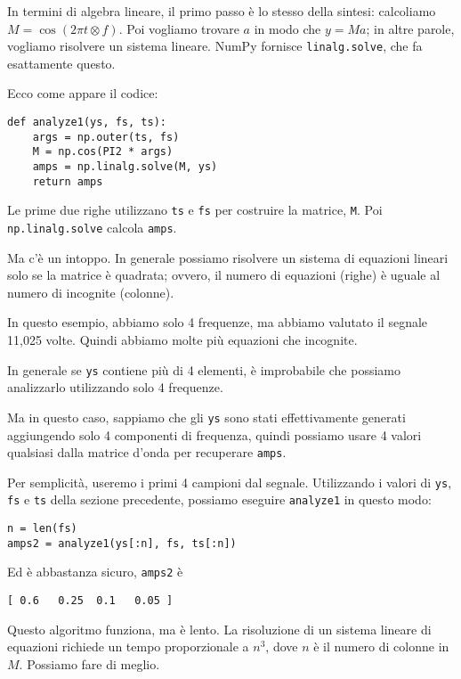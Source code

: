 \documentclass[12pt,a4paper]{book}
\begin{document}
In termini di algebra lineare, il primo passo è lo stesso della sintesi: calcoliamo $M = \cos (2 \pi t \otimes f)$. Poi vogliamo trovare $a$ in modo che $y = M a$; in altre parole, vogliamo risolvere un sistema lineare. NumPy fornisce {\tt linalg.solve}, che fa esattamente questo.

Ecco come appare il codice:

\begin{verbatim} 
def analyze1(ys, fs, ts):
    args = np.outer(ts, fs)
    M = np.cos(PI2 * args)
    amps = np.linalg.solve(M, ys)
    return amps
 \end{verbatim} 

Le prime due righe utilizzano {\tt ts} e {\tt fs} per costruire la matrice, {\tt M}. Poi {\tt np.linalg.solve} calcola {\tt amps}.

Ma c'è un intoppo. In generale possiamo risolvere un sistema di equazioni lineari solo se la matrice è quadrata; ovvero, il numero di equazioni (righe) è uguale al numero di incognite (colonne).

In questo esempio, abbiamo solo 4 frequenze, ma abbiamo valutato il segnale 11,025 volte. Quindi abbiamo molte più equazioni che incognite.

In generale se {\tt ys} contiene più di 4 elementi, è improbabile che possiamo analizzarlo utilizzando solo 4 frequenze.

Ma in questo caso, sappiamo che gli {\tt ys} sono stati effettivamente generati aggiungendo solo 4 componenti di frequenza, quindi possiamo usare 4 valori qualsiasi dalla matrice d'onda per recuperare {\tt amps}.

Per semplicità, useremo i primi 4 campioni dal segnale. Utilizzando i valori di {\tt ys}, {\tt fs} e {\tt ts} della sezione precedente, possiamo eseguire {\tt analyze1} in questo modo:

\begin{verbatim} 
n = len(fs)
amps2 = analyze1(ys[:n], fs, ts[:n])
 \end{verbatim} 

Ed è abbastanza sicuro, {\tt amps2} è

\begin{verbatim} 
[ 0.6   0.25  0.1   0.05 ]
 \end{verbatim} 

Questo algoritmo funziona, ma è lento. La risoluzione di un sistema lineare di equazioni richiede un tempo proporzionale a $n^3$, dove $n$ è il numero di colonne in $M$. Possiamo fare di meglio.
\end{document}

